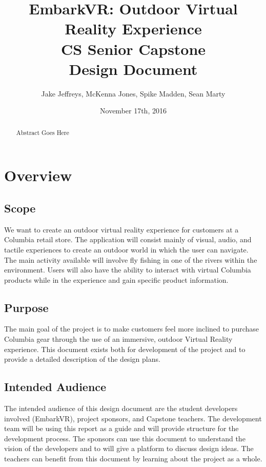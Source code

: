 \documentclass[10pt,journal,compsoc,onecolumn, draftclsnofoot]{IEEEtran}
\title{
EmbarkVR: Outdoor Virtual Reality Experience \\
CS Senior Capstone \\
Design Document\\
\vspace{3cm}
}
\author{Jake Jeffreys, McKenna Jones, Spike Madden, Sean Marty}
\date{November 17th, 2016}
\begin{document}
\begin{titlepage}
\vspace{3cm}
\maketitle
\vspace{3cm}
\begin{abstract}
Abstract Goes Here
\end{abstract}

\end{titlepage}
\tableofcontents
\clearpage

\section{Overview}
\subsection{Scope}
We want to create an outdoor virtual reality experience for customers at a Columbia retail store. The application will consist mainly of visual, audio, and tactile experiences to create an outdoor world in which the user can navigate. The main activity available will involve fly fishing in one of the rivers within the environment. Users will also have the ability to interact with virtual Columbia products while in the experience and gain specific product information.

\subsection{Purpose}
The main goal of the project is to make customers feel more inclined to purchase Columbia gear through the use of an immersive, outdoor Virtual Reality experience. This document exists both for development of the project and to provide a detailed description of the design plans.

\subsection{Intended Audience}
The intended audience of this design document are the student developers involved (EmbarkVR), project sponsors, and Capstone teachers. The development team will be using this report as a guide and will provide structure for the development process. The sponsors can use this document to understand the vision of the developers and to will give a platform to discuss design ideas. The teachers can benefit from this document by learning about the project as a whole.
\end{document}
